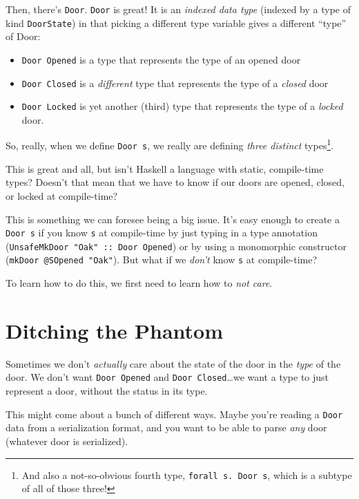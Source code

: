 \documentclass[]{article}
\begin{document}
Then, there's \texttt{Door}. \texttt{Door} is great! It is an \emph{indexed data
type} (indexed by a type of kind \texttt{DoorState}) in that picking a different
type variable gives a different ``type'' of Door:

\begin{itemize}
\tightlist
\item
  \texttt{Door\ \textquotesingle{}Opened} is a type that represents the type of
  an opened door
\item
  \texttt{Door\ \textquotesingle{}Closed} is a \emph{different} type that
  represents the type of a \emph{closed} door
\item
  \texttt{Door\ \textquotesingle{}Locked} is yet another (third) type that
  represents the type of a \emph{locked} door.
\end{itemize}

So, really, when we define \texttt{Door\ s}, we really are defining \emph{three
distinct} types\footnote{And also a not-so-obvious fourth type,
  \texttt{forall\ s.\ Door\ s}, which is a subtype of all of those three!}.

This is great and all, but isn't Haskell a language with static, compile-time
types? Doesn't that mean that we have to know if our doors are opened, closed,
or locked at compile-time?

This is something we can foresee being a big issue. It's easy enough to create a
\texttt{Door\ s} if you know \texttt{s} at compile-time by just typing in a type
annotation (\texttt{UnsafeMkDoor\ "Oak"\ ::\ Door\ \textquotesingle{}Opened}) or
by using a monomorphic constructor (\texttt{mkDoor\ @SOpened\ "Oak"}). But what
if we \emph{don't} know \texttt{s} at compile-time?

To learn how to do this, we first need to learn how to \emph{not care}.

\section{Ditching the Phantom}\label{ditching-the-phantom}

Sometimes we don't \emph{actually} care about the state of the door in the
\emph{type} of the door. We don't want \texttt{Door\ \textquotesingle{}Opened}
and \texttt{Door\ \textquotesingle{}Closed}\ldots{}we want a type to just
represent a door, without the status in its type.

This might come about a bunch of different ways. Maybe you're reading a
\texttt{Door} data from a serialization format, and you want to be able to parse
\emph{any} door (whatever door is serialized).
\end{document}
